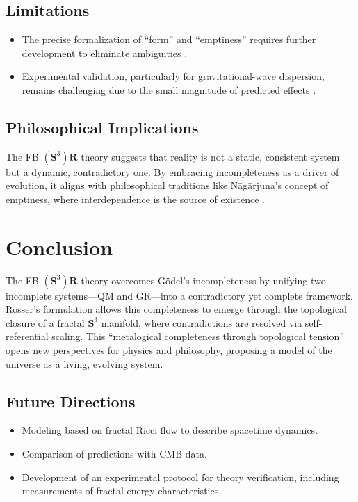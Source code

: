 \documentclass[a4paper,12pt]{article}
\begin{document}
\subsection{Limitations}
\begin{itemize}
    \item The precise formalization of ``form'' and ``emptiness'' requires further development to eliminate ambiguities \cite{Preece2025a}.
    \item Experimental validation, particularly for gravitational-wave dispersion, remains challenging due to the small magnitude of predicted effects \cite{Preece2025b}.
\end{itemize}

\subsection{Philosophical Implications}
The FB $\left(\mathbf{S}^3\right)\mathbf{R}$ theory suggests that reality is not a static, consistent system but a dynamic, contradictory one. By embracing incompleteness as a driver of evolution, it aligns with philosophical traditions like Nāgārjuna's concept of emptiness, where interdependence is the source of existence \cite{Nagarjuna1995}.

\section{Conclusion}
The FB $\left(\mathbf{S}^3\right)\mathbf{R}$ theory overcomes Gödel's incompleteness by unifying two incomplete systems---QM and GR---into a contradictory yet complete framework. Rosser's formulation allows this completeness to emerge through the topological closure of a fractal $\mathbf{S}^3$ manifold, where contradictions are resolved via self-referential scaling. This ``metalogical completeness through topological tension'' opens new perspectives for physics and philosophy, proposing a model of the universe as a living, evolving system.

\subsection{Future Directions}
\begin{itemize}
    \item Modeling based on fractal Ricci flow to describe spacetime dynamics.
    \item Comparison of predictions with CMB data.
    \item Development of an experimental protocol for theory verification, including measurements of fractal energy characteristics.
\end{itemize}
\end{document}
